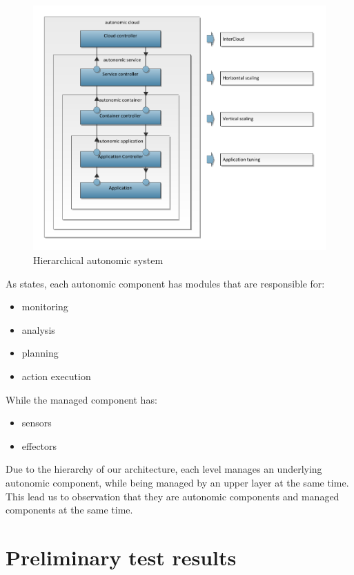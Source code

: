 \documentclass[twocolumn]{svjour3}          %
\begin{document}
\begin{figure}[!ht]
  \includegraphics{drawings/hierarchical-autonomic-system}
  \caption{Hierarchical autonomic system}
  \label{ch5:hierarchical-autonomic-system}
\end{figure}

As \cite{IBM06} states, each autonomic component has modules that are responsible for:
\begin{itemize}
	\item monitoring
	\item analysis
	\item planning
	\item action execution
\end{itemize}

While the managed component has:
\begin{itemize}
	\item sensors
	\item effectors
\end{itemize}

Due to the hierarchy of our architecture, each level manages an underlying autonomic component, while being managed by an upper layer at the same time. This lead us to observation that they are autonomic components and managed components at the same time.

\section{Preliminary test results}
\end{document}
